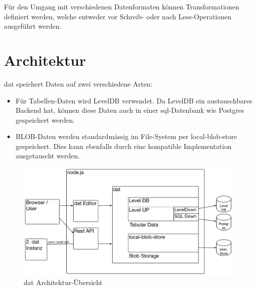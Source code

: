 Für den Umgang mit verschiedenen Datenformaten können Transformationen \cite[transformations]{dat-js-api} definiert werden, welche entweder vor Schreib- oder nach Lese-Operationen ausgeführt werden.

\section{Architektur}


dat speichert Daten auf zwei verschiedene Arten:
\begin{itemize}
\item Für Tabellen-Daten wird LevelDB verwendet. Da LevelDB ein austauschbares Backend hat, können diese Daten auch in einer \acs{sql}-Datenbank wie Postgres gespeichert werden.
\item BLOB-Daten werden standardmässig im File-System per local-blob-store gespeichert. Dies kann ebenfalls durch eine kompatible Implementation ausgetauscht werden.
\end{itemize}

\begin{figure}[H]
  \centering
  \includegraphics[width=\linewidth,clip]{fig/dat-architecture}
  \caption{dat Architektur-Übersicht}
  \label{fig:dat-architecture-overview}
\end{figure}


